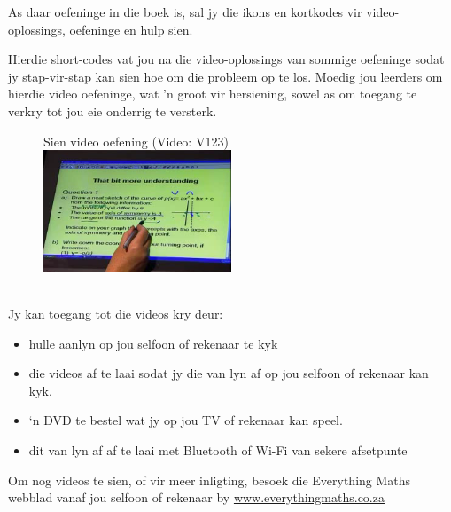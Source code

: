 {\Large
As daar oefeninge in die boek is, sal jy die ikons en kortkodes vir video-oplossings, oefeninge en hulp sien. 

Hierdie short-codes vat jou na die video-oplossings van sommige oefeninge sodat jy stap-vir-stap kan sien hoe om die probleem op te los. Moedig jou leerders om hierdie video oefeninge, wat 'n groot vir hersiening, sowel as om toegang te verkry tot jou eie onderrig te versterk.
\begin{figure}[h]
\begin{center}
Sien video oefening  (Video: V123)\\ 
\includegraphics[width=0.5\textwidth]{../title_images/mindsetexercise.png}
\end{center}
\end{figure}
\\
Jy kan toegang tot die videos kry deur:
\begin{itemize}[noitemsep]
\item hulle aanlyn op jou selfoon of rekenaar te kyk
\item die videos af te laai sodat jy die van lyn af op jou selfoon of rekenaar kan kyk.
\item ‘n DVD te bestel wat jy op jou TV of rekenaar kan speel.
\item dit van lyn af af te laai met Bluetooth of Wi-Fi van sekere afsetpunte
\end{itemize}


Om nog videos te sien, of vir meer inligting, besoek die Everything Maths webblad vanaf jou selfoon of rekenaar by \underline{www.everythingmaths.co.za}    \par
\vspace*{1cm}
}


